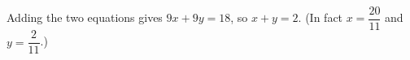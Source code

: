 Adding the two equations gives $9x+9y=18$, so $x+y=\boxed{2}$. (In fact $x=\dfrac{20}{11}$ and $y=\dfrac2{11}$.)
